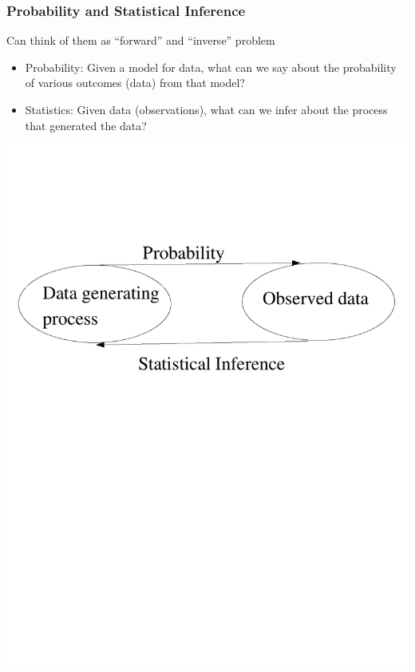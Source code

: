 \documentclass{beamer}
\begin{document}
\begin{frame}
  \frametitle{Probability and Statistical Inference}
Can think of them as ``forward'' and ``inverse'' problem
\begin{itemize}
\item Probability: Given a model for data, what can we say about the
probability of various outcomes (data) from that model?
\item Statistics: %
Given data (observations), what can we infer about the process that
generated the data?
\end{itemize}
\includegraphics[scale=.4]{probinf3.pdf} %
\end{frame}
\end{document}
